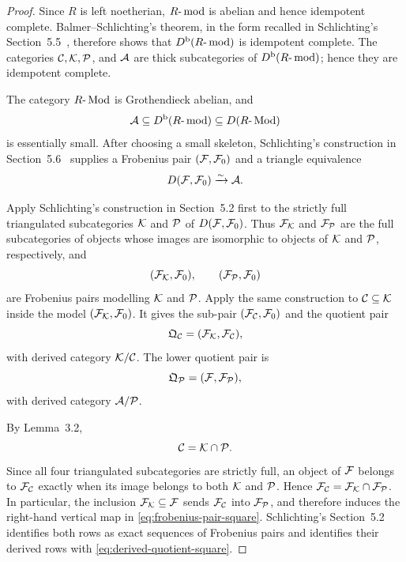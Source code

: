 \begin{proof}
Since \(R\) is left noetherian, \(R\text{-}\operatorname{mod}\) is abelian and hence idempotent complete.  Balmer--Schlichting's theorem, in the form recalled in Schlichting's Section~5.5~\cite{BalmerSchlichting01,Schlichting06}, therefore shows that \(D^{\mathrm b}(R\text{-}\operatorname{mod})\) is idempotent complete.  The categories \(\mathcal C,\mathcal K,\mathcal P\), and \(\mathcal A\) are thick subcategories of \(D^{\mathrm b}(R\text{-}\operatorname{mod})\); hence they are idempotent complete.

The category \(R\text{-}\operatorname{Mod}\) is Grothendieck abelian, and
\[
 \mathcal A\subseteq D^{\mathrm b}(R\text{-}\operatorname{mod})\subseteq D(R\text{-}\operatorname{Mod})
\]
is essentially small.  After choosing a small skeleton, Schlichting's construction in Section~5.6~\cite{Schlichting06} supplies a Frobenius pair \((\mathcal F,\mathcal F_0)\) and a triangle equivalence
\[
 D(\mathcal F,\mathcal F_0)\xrightarrow{\sim}\mathcal A.
\]

Apply Schlichting's construction in Section~5.2 first to the strictly full triangulated subcategories \(\mathcal K\) and \(\mathcal P\) of \(D(\mathcal F,\mathcal F_0)\).  Thus \(\mathcal F_{\mathcal K}\) and \(\mathcal F_{\mathcal P}\) are the full subcategories of objects whose images are isomorphic to objects of \(\mathcal K\) and \(\mathcal P\), respectively, and
\[
 (\mathcal F_{\mathcal K},\mathcal F_0),\qquad (\mathcal F_{\mathcal P},\mathcal F_0)
\]
are Frobenius pairs modelling \(\mathcal K\) and \(\mathcal P\).  Apply the same construction to \(\mathcal C\subseteq\mathcal K\) inside the model \((\mathcal F_{\mathcal K},\mathcal F_0)\).  It gives the sub-pair \((\mathcal F_{\mathcal C},\mathcal F_0)\) and the quotient pair
\[
 \mathfrak Q_{\mathcal C}=(\mathcal F_{\mathcal K},\mathcal F_{\mathcal C}),
\]
with derived category \(\mathcal K/\mathcal C\).  The lower quotient pair is
\[
 \mathfrak Q_{\mathcal P}=(\mathcal F,\mathcal F_{\mathcal P}),
\]
with derived category \(\mathcal A/\mathcal P\).

By Lemma~3.2,
\[
 \mathcal C=\mathcal K\cap\mathcal P.
\]
Since all four triangulated subcategories are strictly full, an object of \(\mathcal F\) belongs to \(\mathcal F_{\mathcal C}\) exactly when its image belongs to both \(\mathcal K\) and \(\mathcal P\).  Hence \(\mathcal F_{\mathcal C}=\mathcal F_{\mathcal K}\cap\mathcal F_{\mathcal P}\).  In particular, the inclusion \(\mathcal F_{\mathcal K}\subseteq\mathcal F\) sends \(\mathcal F_{\mathcal C}\) into \(\mathcal F_{\mathcal P}\), and therefore induces the right-hand vertical map in \eqref{eq:frobenius-pair-square}.  Schlichting's Section~5.2 identifies both rows as exact sequences of Frobenius pairs and identifies their derived rows with \eqref{eq:derived-quotient-square}.
\end{proof}

